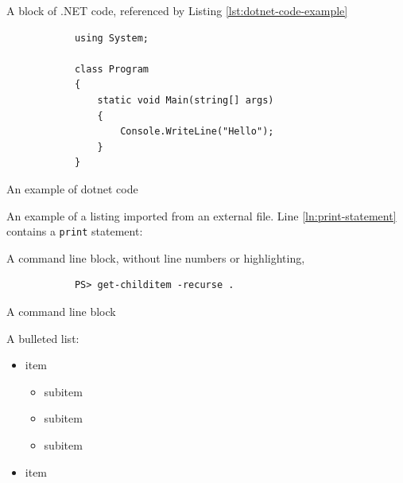 \documentclass[a4paper, 11pt]{article}
\begin{document}
    A block of .NET code, referenced by Listing
    \ref{lst:dotnet-code-example}

    \begin{listing}[H]
        \begin{verbatim}
            using System;
            
            class Program
            {
                static void Main(string[] args)
                {
                    Console.WriteLine("Hello");
                }
            }
        \end{verbatim}
        \caption{An example of dotnet code}
        \label{lst:dotnet-code-example}
    \end{listing}

    An example of a listing imported from an external file. Line
    \ref{ln:print-statement} contains a \texttt{print}
    statement:


    A command line block, without line numbers or highlighting,

    \begin{listing}[H]
        \begin{verbatim}
            PS> get-childitem -recurse .
        \end{verbatim}
        \caption{A command line block}
        \label{lst:command-line-block}
    \end{listing}

    A bulleted list:

    \begin{itemize}
        \item item
        \begin{itemize}
            \item subitem
            \item subitem
            \item subitem
        \end{itemize}
        \item item
    \end{itemize}
\end{document}
